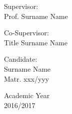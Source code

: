 \begin{center}
\begin{multicols}{2}
	{\large Supervisor:\\}
	Prof. Surname Name\\
	\vspace{5mm}
	
	{\large Co-Supervisor:\\}
	Title Surname Name\\
	\vspace{5mm}
	
	{\large Candidate:\\}
	Surname Name\\
	Matr. xxx/yyy\\
	\vspace{10mm}
\end{multicols}

\vfill

{\large Academic Year\\ 2016/2017}

\end{center}




%
\newpage
\openright

\tableofcontents

%
%


